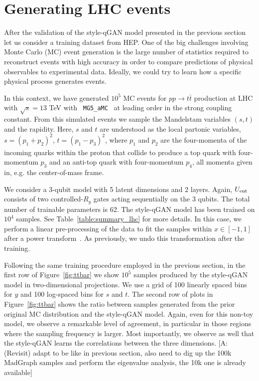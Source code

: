\documentclass[twocolumn,preprintnumbers,superscriptaddress]{revtex4-2}
\newcommand{\commentAF}[1]{{\color{cyan} {[A: #1]}}}
\begin{document}
\section{Generating LHC events}
\label{sec:lhc}

After the validation of the style-qGAN model presented in the previous section
let us consider a training dataset from HEP. One of the big challenges involving
Monte Carlo (MC) event generation is the large number of statistics required to
reconstruct events with high accuracy in order to compare predictions of
physical observables to experimental data. Ideally, we could try
to learn how a specific physical process generates events.

In this context, we have generated $10^5$ MC events for $pp\rightarrow t\bar{t}$
production at LHC with $\sqrt{s} = 13$ TeV with {\tt
MG5\_aMC}~\cite{Alwall:2014hca,Frederix:2018nkq} at leading order in the strong coupling constant. From this simulated events we
sample the Mandelstam variables $(s,t)$ and the rapidity. Here, $s$
and $t$ are understood as the local partonic variables,
$s=(p_1^{}+p_2^{})^2$, $t=(p_1^{}-p_3^{})_{}^2$, where $p_1^{}$ and
$p_2^{}$ are the four-momenta of the incoming quarks within the proton that collide to produce a top quark with four-momentum $p_3^{}$ and an anti-top quark with four-momentum $p_4^{}$, all momenta given in, e.g. the center-of-mass frame.

We consider a 3-qubit model with 5 latent dimensions and 2 layers. Again,
$U_{\rm ent}$ consists of two controlled-$R_{y}$ gates acting sequentially on
the 3 qubits. The total number of trainable parameters is 62. The style-qGAN
model has been trained on $10^4$ samples. See Table~\ref{table:summary_lhc} for more details. In this case, we perform a linear pre-processing of the data
to fit the samples within $x \in [-1, 1]$ after a power
transform~\cite{yeo2000new}. As previously, we undo this transformation after
the training.

Following the same training procedure employed in the previous section, in the
first row of Figure~\ref{fig:ttbar} we show $10^5$ samples produced by the
style-qGAN model in two-dimensional projections. We use a grid of 100 linearly
spaced bins for $y$ and 100 log-spaced bins for $s$ and $t$.
%
The second row of plots in Figure~\ref{fig:ttbar} shows the ratio between
samples generated from the prior original MC distribution and the style-qGAN
model. Again, even for this non-toy model, we observe a remarkable level of agreement, in particular in those regions
where the sampling frequency is larger. Most importantly, we observe as well that the style-qGAN learns
the correlations between the three dimensions. \commentAF{(Revisit) adapt to be like in previous section, also need to dig up the 100k MadGraph samples and perform the eigenvalue analysis, the 10k one is already available}
\end{document}
